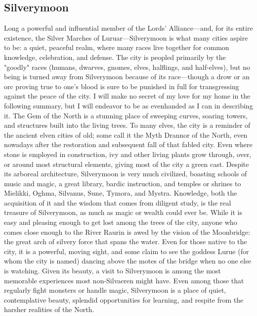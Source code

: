 \documentclass[10pt,a4paper,twoside,twocolumn,openany,bg=print,nodeprecatedcode]{dndbook}
\begin{document}
\subsection{Silverymoon}
Long a powerful and influential member of the Lords' Alliance—and, for its entire existence, the Silver Marches of Luruar—Silverymoon is what many cities aspire to be: a quiet, peaceful realm, where many races live together for common knowledge, celebration, and defense. The city is peopled primarily by the "goodly" races (humans, dwarves, gnomes, elves, halflings, and half-elves), but no being is turned away from Silverymoon because of its race—though a drow or an orc proving true to one's blood is sure to be punished in full for transgressing against the peace of the city. I will make no secret of my love for my home in the following summary, but I will endeavor to be as evenhanded as I can in describing it.
The Gem of the North is a stunning place of sweeping curves, soaring towers, and structures built into the living trees. To many elves, the city is a reminder of the ancient elven cities of old; some call it the Myth Drannor of the North, even nowadays after the restoration and subsequent fall of that fabled city. Even where stone is employed in construction, ivy and other living plants grow through, over, or around most structural elements, giving most of the city a green cast.
Despite its arboreal architecture, Silverymoon is very much civilized, boasting schools of music and magic, a great library, bardic instruction, and temples or shrines to Mielikki, Oghma, Silvanus, Sune, Tymora, and Mystra. Knowledge, both the acquisition of it and the wisdom that comes from diligent study, is the real treasure of Silverymoon, as much as magic or wealth could ever be.
While it is easy and pleasing enough to get lost among the trees of the city, anyone who comes close enough to the River Raurin is awed by the vision of the Moonbridge: the great arch of silvery force that spans the water. Even for those native to the city, it is a powerful, moving sight, and some claim to see the goddess Lurue (for whom the city is named) dancing above the motes of the bridge when no one else is watching.
Given its beauty, a visit to Silverymoon is among the most memorable experiences most non-Silvaeren might have. Even among those that regularly fight monsters or handle magic, Silverymoon is a place of quiet, contemplative beauty, splendid opportunities for learning, and respite from the harsher realities of the North.
\end{document}
